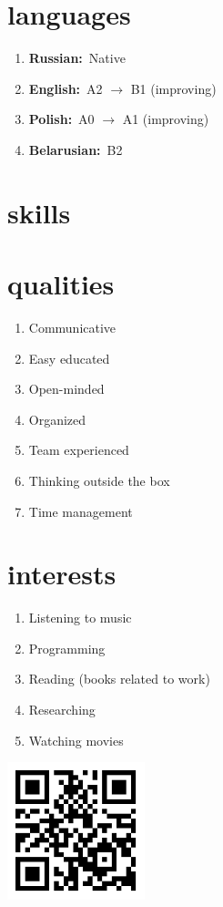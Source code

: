 \documentclass{punko-resume}
\begin{document}
\begin{minipage}[t]{0.33\textwidth}

\section{languages}
\begin{enumerate}
\item \textbf{Russian:}~{Native}
\item \textbf{English:}~{A2 $\to$ B1 (improving)}
\item \textbf{Polish:}~{A0 $\to$ A1 (improving)}
\item \textbf{Belarusian:}~{B2}
\end{enumerate}

\section{skills}

\section{qualities}
\begin{enumerate}
\item Communicative
\item Easy educated
\item Open-minded
\item Organized
\item Team experienced
\item Thinking outside the box
\item Time management
\end{enumerate}

\section{interests}
\begin{enumerate}
\item Listening to music
\item Programming
\item Reading (books related to work)
\item Researching
\item Watching movies
\end{enumerate}

\vspace{10pt}\centering\includegraphics[width=40mm]{qr-code.png}

\end{minipage}
\end{document}
